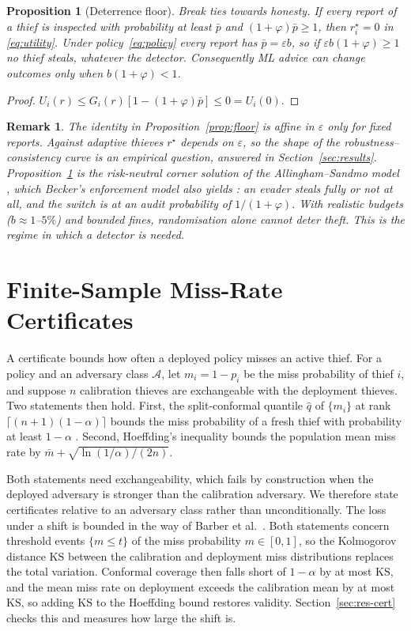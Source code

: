 \documentclass[journal]{IEEEtran}
\newtheorem{proposition}{Proposition}
\newtheorem{remark}{Remark}
\begin{document}
\begin{proposition}[Deterrence floor]\label{prop:deter}
Break ties towards honesty. If every report of a thief is inspected with probability at least $\bar p$ and $(1+\varphi)\bar p\ge1$, then $r_i^\star=0$ in \eqref{eq:utility}. Under policy~\eqref{eq:policy} every report has $\bar p=\varepsilon b$, so if $\varepsilon b(1+\varphi)\ge1$ no thief steals, whatever the detector. Consequently ML advice can change outcomes only when $b(1+\varphi)<1$.
\end{proposition}
\begin{proof}
$U_i(r)\le G_i(r)[1-(1+\varphi)\bar p]\le0=U_i(0)$.
\end{proof}
\begin{remark}
The identity in Proposition~\ref{prop:floor} is affine in $\varepsilon$ only for fixed reports. Against adaptive thieves $r^\star$ depends on $\varepsilon$, so the shape of the robustness--consistency curve is an empirical question, answered in Section~\ref{sec:results}. Proposition~\ref{prop:deter} is the risk-neutral corner solution of the Allingham--Sandmo model \cite{allingham1972}, which Becker's enforcement model also yields \cite{becker1968}: an evader steals fully or not at all, and the switch is at an audit probability of $1/(1+\varphi)$. With realistic budgets ($b\approx1$--$5\%$) and bounded fines, randomisation alone cannot deter theft. This is the regime in which a detector is needed.
\end{remark}

\section{Finite-Sample Miss-Rate Certificates}\label{sec:cert}
A certificate bounds how often a deployed policy misses an active thief. For a policy and an adversary class $\mathcal{A}$, let $m_i=1-p_i$ be the miss probability of thief $i$, and suppose $n$ calibration thieves are exchangeable with the deployment thieves. Two statements then hold. First, the split-conformal quantile $\hat q$ of $\{m_i\}$ at rank $\lceil(n+1)(1-\alpha)\rceil$ bounds the miss probability of a fresh thief with probability at least $1-\alpha$ \cite{vovk2005,lei2018}. Second, Hoeffding's inequality bounds the population mean miss rate by $\bar m+\sqrt{\ln(1/\alpha)/(2n)}$.

Both statements need exchangeability, which fails by construction when the deployed adversary is stronger than the calibration adversary. We therefore state certificates relative to an adversary class rather than unconditionally. The loss under a shift is bounded in the way of Barber et al.~\cite{barber2023}. Both statements concern threshold events $\{m\le t\}$ of the miss probability $m\in[0,1]$, so the Kolmogorov distance $\mathrm{KS}$ between the calibration and deployment miss distributions replaces the total variation. Conformal coverage then falls short of $1-\alpha$ by at most $\mathrm{KS}$, and the mean miss rate on deployment exceeds the calibration mean by at most $\mathrm{KS}$, so adding $\mathrm{KS}$ to the Hoeffding bound restores validity. Section~\ref{sec:res-cert} checks this and measures how large the shift is.
\end{document}
